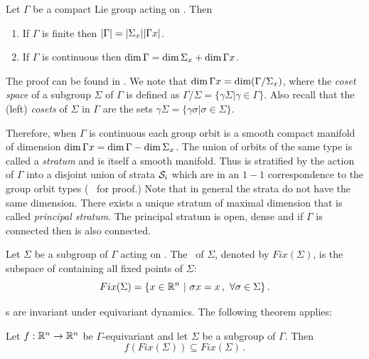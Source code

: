 \begin{proposition}
 \label{pro:dimOrb}
 Let $\Gamma$ be a compact Lie group acting on . Then
 \begin{enumerate}
  \item If $\Gamma$ is finite then $|\Gamma|=|\Sigma_{x}||\Gamma x|$.
  \item If $\Gamma$ is continuous then $\dim \Gamma = \dim \Sigma_{x}+\dim \Gamma x$.
 \end{enumerate}
\end{proposition}
The proof can be found in . We note that
$\dim\Gamma x =\dim(\Gamma/\Sigma_{x})$, where the \emph{coset space} of
a subgroup $\Sigma$  of $\Gamma$ is defined as
$\Gamma/\Sigma=\{\gamma\Sigma|\gamma\in\Gamma\}$.
Also recall that the (left) \emph{cosets} of $\Sigma$ in $\Gamma$ are the sets
$\gamma\Sigma=\{\gamma\sigma|\sigma\in\Sigma\}$.


Therefore, when $\Gamma$ is continuous each group orbit is a smooth compact manifold of dimension
$\dim \Gamma x=\dim \Gamma-\dim \Sigma_{x}$. The union of orbits of the same type is called a \emph{stratum}
and is itself a smooth manifold. Thus  is stratified by the action of $\Gamma$ into
a disjoint union of strata $\mathcal{S}_{i}$ which are in an $1-1$ correspondence to the group orbit types (\cf~ for proof.)
Note that in general the strata do not have the same dimension. There exists a unique stratum  of maximal
dimension that is called \emph{principal stratum}\cite{gatermannHab}. The principal stratum is open, dense
and if $\Gamma$ is connected then  is also connected\cite{ChossLaut00}.

\begin{definition}
 \label{def:fixedsp}
  Let $\Sigma$ be a subgroup of $\Gamma$ acting on . The \fixedsp\ of $\Sigma$,
 denoted by $Fix(\Sigma)$, is the subspace of  containing all fixed points of $\Sigma$:
\[
	Fix(\Sigma)=\{x\in\mathbb{R}^{n}\ |\ \sigma x = x\,,\ \forall \sigma\in\Sigma\}\,.
\]
\end{definition}

\Fixedsp s are invariant under equivariant dynamics. The following theorem applies:

\begin{theorem}
 Let $f:\mathbb{R}^{n}\rightarrow\mathbb{R}^{n}$ be $\Gamma$-equivariant and let $\Sigma$ be a subgroup of $\Gamma$. Then
\[
 f\left(Fix(\Sigma)\right)\subseteq Fix(\Sigma)\,.
\]
\end{theorem}

